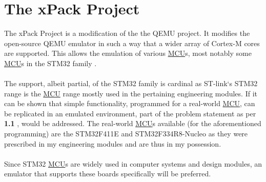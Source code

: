 \section{The xPack Project}
\label{xpack}
The xPack Project is a modification of the the QEMU project. It modifies the open-source QEMU emulator in such a way that a wider array of Cortex-M cores are supported. This allows the emulation of various \hyperref[listAbr]{MCU}s, most notably some \hyperref[listAbr]{MCU}s in the STM32 family \cite{xPack}.
\\\\
The support, albeit partial, of the STM32 family is cardinal as ST-link`s STM32  range is the \hyperref[listAbr]{MCU} range mostly used in the pertaining engineering modules. If it can be shown that simple functionality, programmed for a real-world \hyperref[listAbr]{MCU}, can be replicated in an emulated environment, part of the problem statement as per \textbf{1.1 }, would be addressed. The real-world \hyperref[listAbr]{MCU}s available (for the aforementioned programming) are the STM32F411E and STM32F334R8-Nucleo as they were prescribed in my engineering modules and are thus in my possession.
\\\\
Since STM32 \hyperref[listAbr]{MCU}s are widely used in computer systems and design modules, an emulator that supports these boards specifically will be preferred. 
\\\\








